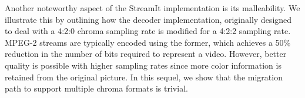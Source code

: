Another noteworthy aspect of the StreamIt implementation is its
malleability. We illustrate this by outlining how the decoder
implementation, originally designed to deal with a 4:2:0 chroma
sampling rate is modified for a 4:2:2 sampling rate. MPEG-2 streams
are typically encoded using the former, which achieves a 50\%
reduction in the number of bits required to represent a
video. However, better quality is possible with higher sampling rates
since more color information is retained from the original picture. In
this sequel, we show that the migration path to support multiple
chroma formats is trivial.







